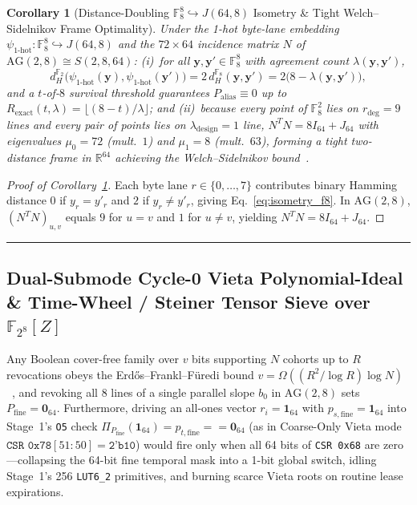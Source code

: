 \documentclass[10pt,twocolumn]{article}
\makeatletter
\newif\ifspecintwocol \specintwocolfalse
\newif\ifspecresume   \specresumefalse
\newcommand{\StartTwoCol}{%
  \if@twocolumn
    \let\spec@next\@empty
  \else
    \ifspecintwocol
      \let\spec@next\@empty
    \else
      \global\specintwocoltrue
      \def\spec@next{\begin{multicols}{2}}%
    \fi
  \fi
  \spec@next
}
\newcommand{\EndConnesPlate}{%
  \par\vspace{3pt}\noindent\textcolor{black!25}{\rule{\textwidth}{0.4pt}}\par\vspace{4pt}%
  \ifspecresume
    \global\specresumefalse
    \let\spec@platepost\StartTwoCol
  \else
    \let\spec@platepost\@empty
  \fi
  \spec@platepost
}
\theoremstyle{spectralthm}
\newtheorem{corollary}[theorem]{Corollary}
\makeatother
\begin{document}
\begin{corollary}[Distance-Doubling $\mathbb{F}_8^8 \hookrightarrow J(64,8)$ Isometry \& Tight Welch--Sidelnikov Frame Optimality]
\label{cor:frame}
Under the 1-hot byte-lane embedding $\psi_{\text{1-hot}} : \mathbb{F}_8^8 \hookrightarrow J(64,8)$ and the $72 \times 64$ incidence matrix $N$ of $\mathrm{AG}(2,8) \cong S(2,8,64)$:
(i)~for all $\mathbf{y}, \mathbf{y}' \in \mathbb{F}_8^8$ with agreement count $\lambda(\mathbf{y},\mathbf{y}')$,
\begin{equation}
\label{eq:isometry_f8}
d_H^{\mathbb{F}_2}\bigl(\psi_{\text{1-hot}}(\mathbf{y}), \psi_{\text{1-hot}}(\mathbf{y}')\bigr) = 2\,d_H^{\mathbb{F}_8}(\mathbf{y}, \mathbf{y}') = 2\bigl(8 - \lambda(\mathbf{y}, \mathbf{y}')\bigr),
\end{equation}
and a $t$-of-$8$ survival threshold guarantees $P_{\mathrm{alias}} \equiv 0$ up to $R_{\mathrm{exact}}(t,\lambda) = \lfloor (8 - t)/\lambda \rfloor$; and
(ii)~because every point of $\mathbb{F}_8^2$ lies on $r_{\mathrm{deg}} = 9$ lines and every pair of points lies on $\lambda_{\mathrm{design}} = 1$ line, $N^T N = 8 I_{64} + J_{64}$ with eigenvalues $\mu_0 = 72$ (mult.\ $1$) and $\mu_1 = 8$ (mult.\ $63$), forming a tight two-distance frame in $\mathbb{R}^{64}$ achieving the Welch--Sidelnikov bound~\cite{welch1974lower}.
\end{corollary}
\begin{proof}[Proof of Corollary~\ref{cor:frame}]
Each byte lane $r \in \{0,\ldots,7\}$ contributes binary Hamming distance $0$ if $y_r = y'_r$ and $2$ if $y_r \neq y'_r$, giving Eq.~\eqref{eq:isometry_f8}. In $\mathrm{AG}(2,8)$, $(N^T N)_{u,v}$ equals $9$ for $u = v$ and $1$ for $u \neq v$, yielding $N^T N = 8 I_{64} + J_{64}$.
\end{proof}
\EndConnesPlate

\subsection{Dual-Submode Cycle-0 Vieta Polynomial-Ideal \& Time-Wheel / Steiner Tensor Sieve over \texorpdfstring{$\mathbb{F}_{2^8}[Z]$}{F\_(2\^8)[Z]}}
\label{sec:vieta}
Any Boolean cover-free family over $v$ bits supporting $N$ cohorts up to $R$ revocations obeys the Erd\H{o}s--Frankl--F\"{u}redi bound $v = \Omega((R^2 / \log R)\log N)$~\cite{erdos1985families,macwilliams1977theory}, and revoking all 8 lines of a single parallel slope $b_0$ in $\mathrm{AG}(2,8)$ sets $P_{\mathrm{fine}} = \mathbf{0}_{64}$. Furthermore, driving an all-ones vector $r_i = \mathbf{1}_{64}$ with $p_{s,\mathrm{fine}} = \mathbf{1}_{64}$ into Stage~1's \texttt{O5} check $\Pi_{P_{\mathrm{fine}}}(\mathbf{1}_{64}) = p_{t,\mathrm{fine}} == \mathbf{0}_{64}$ (as in Coarse-Only Vieta mode $\texttt{CSR~0x78}[51:50] = \texttt{2'b10}$) would fire only when all 64 bits of \texttt{CSR 0x68} are zero---collapsing the 64-bit fine temporal mask into a 1-bit global switch, idling Stage~1's 256 \mbox{\texttt{LUT6\_2}} primitives, and burning scarce Vieta roots on routine lease expirations.
\end{document}
